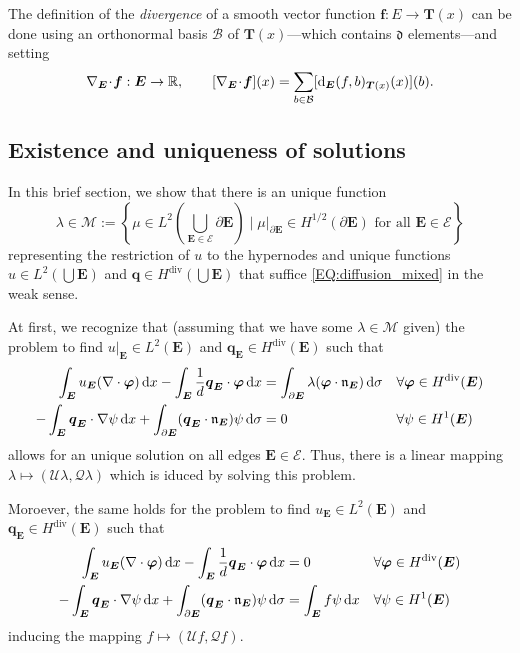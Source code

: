 \documentclass[a4paper, english, 12pt, reqno, draft]{amsart}
\theoremstyle{definition}
\theoremstyle{remark}
\numberwithin{equation}{section}
\newcommand{\SetEdge}{\ensuremath{\boldsymbol{\mathcal E}}}
\newcommand{\Edge}{{\ensuremath{\boldsymbol E}}}
\newcommand{\locDim}{\ensuremath{\mathfrak d}}
\newcommand{\Der}{\ensuremath{\textup d_\Edge}}
\newcommand{\Nabla}{\ensuremath{\nabla_\Edge}}
\newcommand{\Div}{\ensuremath{\Nabla\!\cdot\!}}
\newcommand{\tangent}{\ensuremath{{\boldsymbol T}}}
\newcommand{\Normal}{\ensuremath{\mathfrak n_\Edge}}
\newcommand{\basis}{\ensuremath{\mathcal B}}
\newcommand{\IR}{\ensuremath{\mathbb R}}
\newcommand{\skeletalSpaceCont}{\ensuremath{\mathcal M}}
\renewcommand{\vec}[1]{\ensuremath{\boldsymbol{#1}}}
\newcommand{\dx}{\ensuremath{\, \textup d x}}
\newcommand{\ds}{\ensuremath{\, \textup d \sigma}}
\newcommand{\localU}{\ensuremath{\mathcal U}}
\newcommand{\localQ}{\ensuremath{\vec{\mathcal Q}}}
\begin{document}
The definition of the \emph{divergence} of a smooth vector function $\vec f \colon E \to \tangent(x)$ can be done using an orthonormal basis $\basis$ of $\tangent(x)$---which contains $\locDim$ elements---and setting
% 
\begin{equation*}
 \Div \vec f: \Edge \to \IR, \qquad [\Div \vec f](x) = \sum_{b \in \basis} [\Der (f, b)_{\tangent(x)} (x)](b).
\end{equation*}
% 
\subsection{Existence and uniqueness of solutions}\label{SEC:ExUnique}
% 
In this brief section, we show that there is an unique function
% 
\begin{equation}
 \lambda \in \skeletalSpaceCont := \left\{ \mu \in L^2(\bigcup_{\Edge \in \SetEdge} \partial \Edge) \; \bigg| \; \mu |_{\partial \Edge} \in H^{1/2} (\partial \Edge) \text{ for all } \Edge \in \SetEdge \right\}
\end{equation}
% 
representing the restriction of $u$ to the hypernodes and unique functions $u \in L^2(\bigcup \Edge)$ and $\vec q \in H^{\operatorname{div}}(\bigcup \Edge)$ that suffice \eqref{EQ:diffusion_mixed} in the weak sense.

At first, we recognize that (assuming that we have some $\lambda \in \skeletalSpaceCont$ given) the problem to find $u|_\Edge \in L^2(\Edge)$ and $\vec q_\Edge \in H^{\operatorname{div}}(\Edge)$ such that
% 
\begin{subequations}\label{EQ:cont_lambda}
\begin{align}
 \int_\Edge u_\Edge (\nabla \cdot \vec \varphi) \dx - \int_\Edge \frac{1}{d} \vec q_\Edge \cdot \vec \varphi \dx & = \int_{\partial \Edge} \lambda (\vec \varphi \cdot \Normal) \ds && \forall \vec \varphi \in H^{\operatorname{div}}(\Edge) \\
 - \int_\Edge \vec q_\Edge \cdot \nabla \psi \dx + \int_{\partial \Edge} (\vec q_\Edge \cdot \Normal) \psi \ds & = 0 && \forall \psi \in H^1(\Edge)
\end{align}
\end{subequations}
% 
allows for an unique solution on all edges $\Edge \in \SetEdge$. Thus, there is a linear mapping $\lambda \mapsto (\localU \lambda, \localQ\lambda)$ which is iduced by solving this problem.

Moroever, the same holds for the problem to find $u_\Edge \in L^2(\Edge)$ and $\vec q_\Edge \in H^{\operatorname{div}}(\Edge)$ such that
% 
\begin{subequations}
\begin{align}
 \int_\Edge u_\Edge (\nabla \cdot \vec \varphi) \dx - \int_\Edge \frac{1}{d} \vec q_\Edge \cdot \vec \varphi \dx & = 0 && \forall \vec \varphi \in H^{\operatorname{div}}(\Edge) \\
 - \int_\Edge \vec q_\Edge \cdot \nabla \psi \dx + \int_{\partial \Edge} (\vec q_\Edge \cdot \Normal) \psi \ds & = \int_\Edge f \psi \dx && \forall \psi \in H^1(\Edge)
\end{align}
\end{subequations}
% 
inducing the mapping $f \mapsto (\localU f, \localQ f)$.
\end{document}
